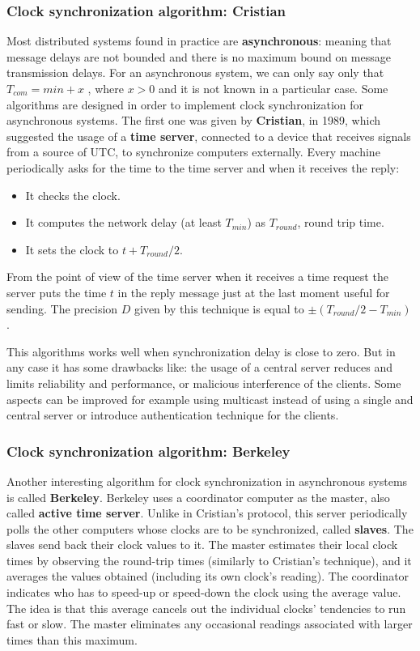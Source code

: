 \documentclass[11pt,a4paper]{article}
\begin{document}
\subsubsection{Clock synchronization algorithm: Cristian}
Most distributed systems found in practice are \textbf{asynchronous}: meaning that message delays are not bounded and there is no maximum bound on message transmission delays. For an asynchronous system, we can only say only that $T_{com} = min + x$ , where $x > 0$ and it is not known in a particular case.
Some algorithms are designed in order to implement clock synchronization for asynchronous systems. The first one was given by \textbf{Cristian}, in 1989, which suggested the usage of a \textbf{time server}, connected to a device that receives signals from a source of UTC, to synchronize computers externally. 
Every machine periodically asks for the time to the time server and when it receives the reply:
\begin{itemize}
	\item It checks the clock.
	\item It computes the network delay (at least $T_{min}$) as $T_{round}$, round trip time.
	\item It sets the clock to $t+ T_{round}/2$.
\end{itemize}
From the point of view of the time server when it receives a time request the server puts the time $t$ in the reply message just at the last moment useful for sending.
The precision $D$ given by this technique is equal to $\pm (T_{round}/2 - T_{min})$.

This algorithms works well when synchronization delay is close to zero. But in any case it has some drawbacks like: the usage of a central server reduces and limits reliability and performance, or malicious interference of the clients. Some aspects can be improved for example using multicast instead of using a single and central server or introduce authentication technique for the clients.

\subsubsection{Clock synchronization algorithm: Berkeley}
Another interesting algorithm for clock synchronization in asynchronous systems is called \textbf{Berkeley}. Berkeley uses a coordinator computer as the master, also called \textbf{active time server}. Unlike in Cristian’s protocol, this server periodically polls the other computers whose clocks are to be synchronized, called \textbf{slaves}. The slaves send back their clock values to it. The master estimates their local
clock times by observing the round-trip times (similarly to Cristian’s technique), and it averages the values obtained (including its own clock’s reading). The coordinator indicates who has to speed-up or speed-down the clock using the average value. The idea is that this average cancels out the individual clocks’ tendencies to run fast or slow. The master eliminates any occasional readings associated with larger times than this maximum.
\end{document}
